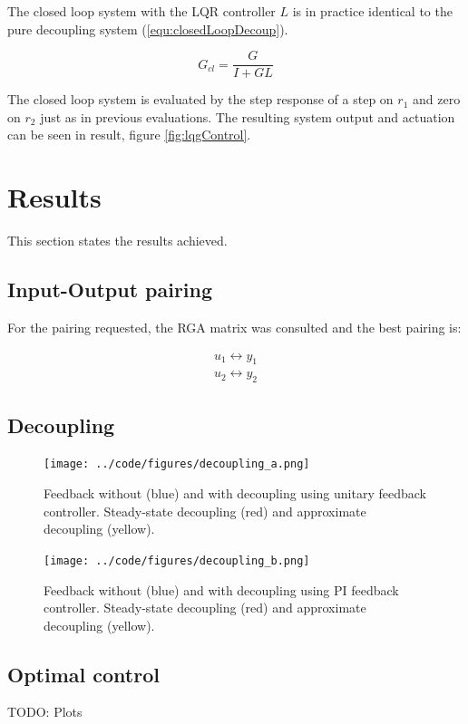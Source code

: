 \documentclass[a4paper, titlepage]{article}
\begin{document}
The closed loop system with the LQR controller $L$ is in practice identical to the pure decoupling system (\ref{equ:closedLoopDecoup}).

\begin{equation}
G_{cl} = \frac{G}{I + GL}
\end{equation}

The closed loop system is evaluated by the step response of a step on $r_1$ and zero on $r_2$ just as in previous evaluations.
The resulting system output and actuation can be seen in result, figure \ref{fig:lqgControl}.


\section{Results}
This section states the results achieved.

\subsection{Input-Output pairing}
For the pairing requested, the RGA matrix was consulted and the best pairing is:

\begin{equation}
\begin{split}
u_1 \leftrightarrow y_1 \\
u_2 \leftrightarrow y_2
\end{split}
\end{equation}

\subsection{Decoupling}

\begin{figure}[h!]
\center
\texttt{[image: ../code/figures/decoupling\_a.png]}
\caption{Feedback without (blue) and with decoupling using unitary feedback controller. Steady-state decoupling (red) and approximate decoupling (yellow).}
\label{fig:decouplingA}
\end{figure}


\begin{figure}[h!]
\center
\texttt{[image: ../code/figures/decoupling\_b.png]}
\caption{Feedback without (blue) and with decoupling using PI feedback controller. Steady-state decoupling (red) and approximate decoupling (yellow).}
\label{fig:decouplingB}
\end{figure}



\subsection{Optimal control}
TODO: Plots
\end{document}
